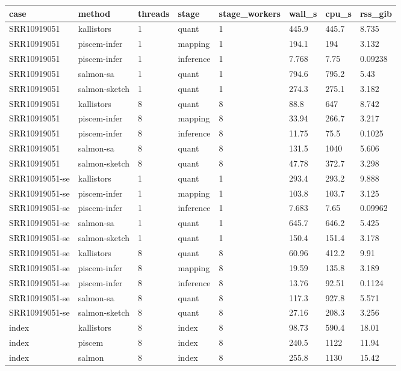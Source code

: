 \begin{tabular}{llllllll}
\toprule
case & method & threads & stage & stage\_workers & wall\_s & cpu\_s & rss\_gib \\
\midrule
SRR10919051 & kallistors & 1 & quant & 1 & 445.9 & 445.7 & 8.735 \\
SRR10919051 & piscem-infer & 1 & mapping & 1 & 194.1 & 194 & 3.132 \\
SRR10919051 & piscem-infer & 1 & inference & 1 & 7.768 & 7.75 & 0.09238 \\
SRR10919051 & salmon-sa & 1 & quant & 1 & 794.6 & 795.2 & 5.43 \\
SRR10919051 & salmon-sketch & 1 & quant & 1 & 274.3 & 275.1 & 3.182 \\
SRR10919051 & kallistors & 8 & quant & 8 & 88.8 & 647 & 8.742 \\
SRR10919051 & piscem-infer & 8 & mapping & 8 & 33.94 & 266.7 & 3.217 \\
SRR10919051 & piscem-infer & 8 & inference & 8 & 11.75 & 75.5 & 0.1025 \\
SRR10919051 & salmon-sa & 8 & quant & 8 & 131.5 & 1040 & 5.606 \\
SRR10919051 & salmon-sketch & 8 & quant & 8 & 47.78 & 372.7 & 3.298 \\
SRR10919051-se & kallistors & 1 & quant & 1 & 293.4 & 293.2 & 9.888 \\
SRR10919051-se & piscem-infer & 1 & mapping & 1 & 103.8 & 103.7 & 3.125 \\
SRR10919051-se & piscem-infer & 1 & inference & 1 & 7.683 & 7.65 & 0.09962 \\
SRR10919051-se & salmon-sa & 1 & quant & 1 & 645.7 & 646.2 & 5.425 \\
SRR10919051-se & salmon-sketch & 1 & quant & 1 & 150.4 & 151.4 & 3.178 \\
SRR10919051-se & kallistors & 8 & quant & 8 & 60.96 & 412.2 & 9.91 \\
SRR10919051-se & piscem-infer & 8 & mapping & 8 & 19.59 & 135.8 & 3.189 \\
SRR10919051-se & piscem-infer & 8 & inference & 8 & 13.76 & 92.51 & 0.1124 \\
SRR10919051-se & salmon-sa & 8 & quant & 8 & 117.3 & 927.8 & 5.571 \\
SRR10919051-se & salmon-sketch & 8 & quant & 8 & 27.16 & 208.3 & 3.256 \\
index & kallistors & 8 & index & 8 & 98.73 & 590.4 & 18.01 \\
index & piscem & 8 & index & 8 & 240.5 & 1122 & 11.94 \\
index & salmon & 8 & index & 8 & 255.8 & 1130 & 15.42 \\
\bottomrule
\end{tabular}
